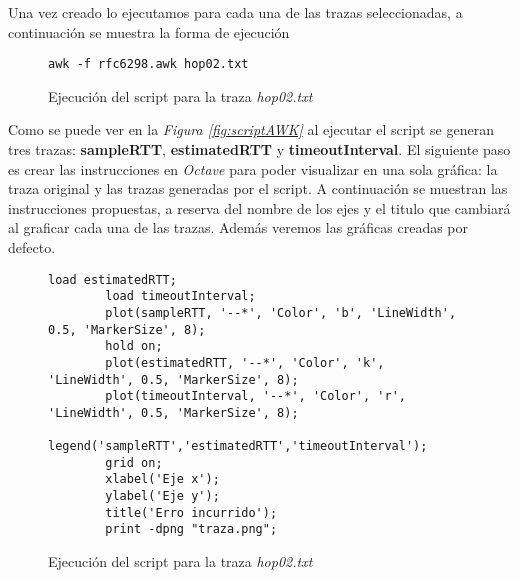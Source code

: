 \noindent Una vez creado lo ejecutamos para cada una de las trazas seleccionadas, a continuaci\'on se muestra la forma de
ejecuci\'on 

\begin{figure}[H]
    \centering
    \begin{lstlisting}[frame=single, breaklines=true, basicstyle=\footnotesize\ttfamily, breakatwhitespace=false, 
        columns=flexible, tabsize=2, showstringspaces=fals] 
        awk -f rfc6298.awk hop02.txt
    \end{lstlisting}
    \caption{Ejecuci\'on del script para la traza \textit{hop02.txt}}
    \label{fig:execScript}
\end{figure}

\noindent Como se puede ver en la \textit{Figura \ref*{fig:scriptAWK}} al ejecutar el script se generan tres trazas: 
\textbf{sampleRTT}, \textbf{estimatedRTT} y \textbf{timeoutInterval}. El siguiente paso es crear las instrucciones en 
\textit{Octave} para poder visualizar en una sola gr\'afica: la traza original y las trazas generadas por el script. 
A continuaci\'on se muestran las instrucciones propuestas, a reserva del nombre de los ejes y el titulo que cambiar\'a
al graficar cada una de las trazas. Adem\'as veremos las gr\'aficas creadas por defecto.

\begin{figure}[H]
    \centering
    \begin{lstlisting}[frame=single, breaklines=true, basicstyle=\footnotesize\ttfamily, breakatwhitespace=false, 
        columns=flexible, tabsize=2, showstringspaces=fals] 
        load estimatedRTT;
        load timeoutInterval;
        plot(sampleRTT, '--*', 'Color', 'b', 'LineWidth', 0.5, 'MarkerSize', 8);
        hold on;
        plot(estimatedRTT, '--*', 'Color', 'k', 'LineWidth', 0.5, 'MarkerSize', 8);
        plot(timeoutInterval, '--*', 'Color', 'r', 'LineWidth', 0.5, 'MarkerSize', 8);
        legend('sampleRTT','estimatedRTT','timeoutInterval');
        grid on;
        xlabel('Eje x');
        ylabel('Eje y');
        title('Erro incurrido');
        print -dpng "traza.png";
    \end{lstlisting}
    \caption{Ejecuci\'on del script para la traza \textit{hop02.txt}}
    \label{fig:execScript}
\end{figure}


